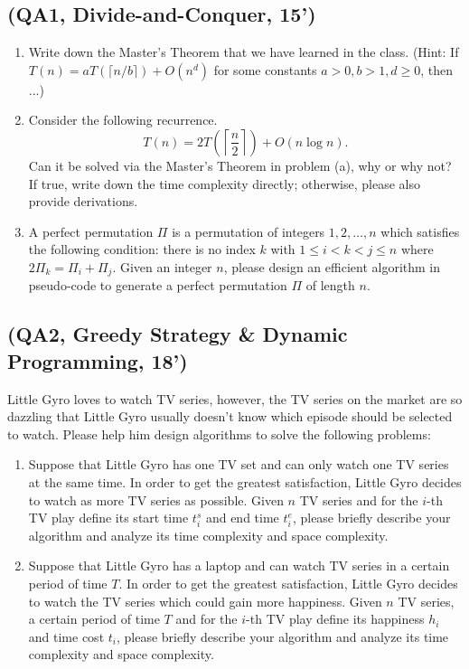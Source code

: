 \documentclass[11pt, a4paper]{article}
\begin{document}
\subsection*{(QA1, Divide-and-Conquer, 15')}
\begin{enumerate}[label=(\alph*), leftmargin=*]
    \item Write down the Master's Theorem that we have learned in the class. (Hint: If \(T(n) = aT(\lceil n/b \rceil) + O(n^d)\) for some constants \(a > 0, b > 1, d \geq 0\), then ...)
    \item Consider the following recurrence.
    \[ T(n) = 2T\left(\left\lceil \frac{n}{2} \right\rceil\right) + O(n\log n). \]
    Can it be solved via the Master's Theorem in problem (a), why or why not? If true, write down the time complexity directly; otherwise, please also provide derivations.
    \item A perfect permutation \(\Pi\) is a permutation of integers \(1, 2, \ldots, n\) which satisfies the following condition: there is no index \(k\) with \(1 \leq i < k < j \leq n\) where \(2\Pi_k = \Pi_i + \Pi_j\). Given an integer \(n\), please design an efficient algorithm in pseudo-code to generate a perfect permutation \(\Pi\) of length \(n\).
\end{enumerate}

\subsection*{(QA2, Greedy Strategy \& Dynamic Programming, 18')}
Little Gyro loves to watch TV series, however, the TV series on the market are so dazzling that Little Gyro usually doesn't know which episode should be selected to watch. Please help him design algorithms to solve the following problems:

\begin{enumerate}[label=(\alph*), leftmargin=*]
    \item Suppose that Little Gyro has one TV set and can only watch one TV series at the same time. In order to get the greatest satisfaction, Little Gyro decides to watch as more TV series as possible. Given \(n\) TV series and for the \(i\)-th TV play define its start time \(t_i^s\) and end time \(t_i^e\), please briefly describe your algorithm and analyze its time complexity and space complexity.
    \item Suppose that Little Gyro has a laptop and can watch TV series in a certain period of time \(T\). In order to get the greatest satisfaction, Little Gyro decides to watch the TV series which could gain more happiness. Given \(n\) TV series, a certain period of time \(T\) and for the \(i\)-th TV play define its happiness \(h_i\) and time cost \(t_i\), please briefly describe your algorithm and analyze its time complexity and space complexity.
\end{enumerate}
\end{document}
